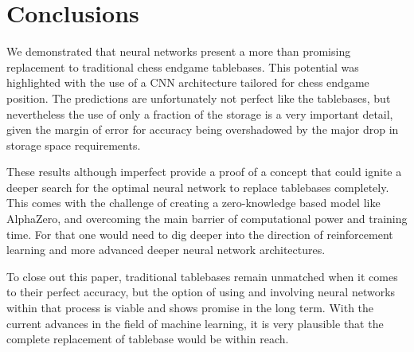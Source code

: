 \section{Conclusions}
\label{sec:Conclusions}
We demonstrated that neural networks present a more than promising replacement to traditional chess endgame tablebases. This potential was highlighted with the use of a CNN architecture tailored for chess endgame position. The predictions are unfortunately not perfect like the tablebases, but nevertheless the use of only a fraction of the storage is a very important detail, given the margin of error for accuracy being overshadowed by the major drop in storage space requirements.

These results although imperfect provide a proof of a concept that could ignite a deeper search for the optimal neural network to replace tablebases completely. This comes with the challenge of creating a zero-knowledge based model like AlphaZero, and overcoming the main barrier of computational power and training time. For that one would need to dig deeper into the direction of reinforcement learning and more advanced deeper neural network architectures.

To close out this paper, traditional tablebases remain unmatched when it comes to their perfect accuracy, but the option of using and involving neural networks within that process is viable and shows promise in the long term. With the current advances in the field of machine learning, it is very plausible that the complete replacement of tablebase would be within reach.